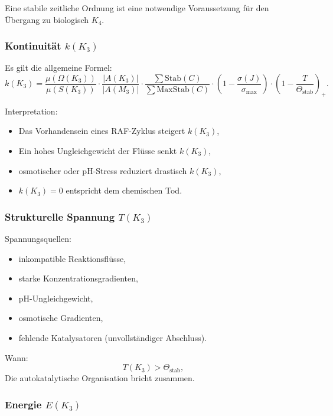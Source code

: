 Eine stabile zeitliche Ordnung ist eine notwendige Voraussetzung für den Übergang zu
biologisch $K_4$.

\subsubsection{Kontinuität \texorpdfstring{$k(K_3)$}{k(K_3)}}

Es gilt die allgemeine Formel:
\[
k(K_3) =
\frac{\mu(\Omega(K_3))}{\mu(S(K_3))}
\cdot
\frac{|A(K_3)|}{|A(M_3)|}
\cdot
\frac{\sum \mathrm{Stab}(C)}{\sum \mathrm{MaxStab}(C)}
\cdot
(1 - \frac{\sigma(J)}{\sigma_{\max}})
\cdot
(1 - \frac{T}{\Theta_{\mathrm{stab}}})_+.
\]

Interpretation:
\begin{itemize}
    \item Das Vorhandensein eines RAF-Zyklus steigert $k(K_3)$,
    \item Ein hohes Ungleichgewicht der Flüsse senkt $k(K_3)$,
    \item osmotischer oder pH-Stress reduziert drastisch $k(K_3)$,
    \item $k(K_3)=0$ entspricht dem chemischen Tod.
\end{itemize}

\subsubsection{Strukturelle Spannung \texorpdfstring{$T(K_3)$}{T(K_3)}}

Spannungsquellen:
\begin{itemize}
    \item inkompatible Reaktionsflüsse,
    \item starke Konzentrationsgradienten,
    \item pH-Ungleichgewicht,
    \item osmotische Gradienten,
    \item fehlende Katalysatoren (unvollständiger Abschluss).
\end{itemize}

Wann:
\[
T(K_3) > \Theta_{\mathrm{stab}},
\]
Die autokatalytische Organisation bricht zusammen.

\subsubsection{Energie \texorpdfstring{$E(K_3)$}{E(K_3)}}

